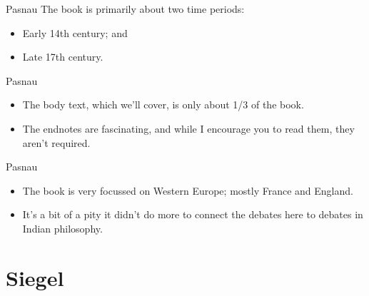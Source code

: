 \documentclass[
  17pt,
  letterpaper,
  ignorenonframetext,
  aspectratio=169,
]{beamer}
\providecommand{\tightlist}{%
  \setlength{\itemsep}{0pt}\setlength{\parskip}{0pt}}\usepackage{longtable,booktabs,array}
\begin{document}
\begin{frame}{Pasnau}
\protect\hypertarget{pasnau-1}{}
The book is primarily about two time periods:

\begin{itemize}[<+->]
\tightlist
\item
  Early 14th century; and
\item
  Late 17th century.
\end{itemize}
\end{frame}

\begin{frame}{Pasnau}
\protect\hypertarget{pasnau-2}{}
\begin{itemize}[<+->]
\tightlist
\item
  The body text, which we'll cover, is only about 1/3 of the book.
\item
  The endnotes are fascinating, and while I encourage you to read them,
  they aren't required.
\end{itemize}
\end{frame}

\begin{frame}{Pasnau}
\protect\hypertarget{pasnau-3}{}
\begin{itemize}[<+->]
\tightlist
\item
  The book is very focussed on Western Europe; mostly France and
  England.
\item
  It's a bit of a pity it didn't do more to connect the debates here to
  debates in Indian philosophy.
\end{itemize}
\end{frame}

\hypertarget{siegel}{%
\section{Siegel}\label{siegel}}
\end{document}
